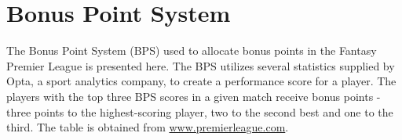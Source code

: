 

\appendix

\renewcommand{\thechapter}{\Alph{chapter}}


\chapter{Bonus Point System}\label{A1_BPS}

The Bonus Point System (BPS) used to allocate bonus points in the Fantasy Premier League is presented here. The BPS utilizes several statistics supplied by Opta, a sport analytics company, to create a performance score for a player. The players with the top three BPS scores in a given match receive bonus points - three points to the highest-scoring player, two to the second best and one to the third. The table is obtained from \url{www.premierleague.com}. 

